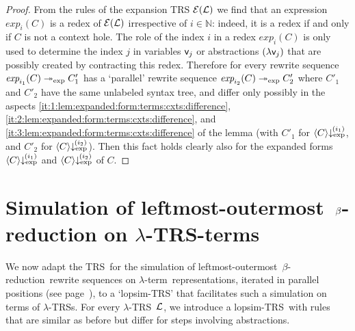 \documentclass[
submission
]{dmtcs-episciences-tampered}
\newcommand{\fap}[2]{#1({#2})}
\newcommand{\indap}[2]{#1 _{#2}}
\newcommand{\bpap}[3]{#1 _{#2}^{#3}}
\newcommand{\nb}{\nobreakdash}
\newcommand{\nf}{\normalfont}
\newcommand{\nat}{\mathbb{N}}
\newcommand{\alTRS}{{\cal L}}
\newcommand{\TRS}{TRS}
\newcommand{\sfolabs}[1]{(\lambda{#1})}
\newcommand{\afovar}{\mathsf{v}}
\newcommand{\afovari}[1]{\indap{\afovar}{\hspace*{-0.25pt}#1}}
\newcommand{\acxt}{C}
\newcommand{\sexpandTRS}{{\cal E}}
\newcommand{\expandTRSwrt}{\fap{\sexpandTRS}}
\newcommand{\lopsimTRS}{lopsim-TRS}
\newcommand{\smred}{\twoheadrightarrow}
\newcommand{\smredi}{\indap{\smred}}
\newcommand{\mredi}[1]{\mathrel{\smredi{#1}}}
\newcommand{\scriptexp}{\text{\nf exp}}
\newcommand{\sexpand}{\textit{exp}}
\newcommand{\sexpandi}{\indap{\sexpand}}
\newcommand{\expandi}[1]{\fap{\sexpandi{#1}}}
\newcommand{\expmred}{\mredi{\scriptexp}}
\newcommand{\sexprednfi}[1]{{\bpap{\downarrow}{\scriptexp}{\hspace*{-1pt}(#1)}}}
\newcommand{\exprednfi}[2]{{\langle#2\rangle}\sexprednfi{#1}}
\newcommand{\lambdaterm}{$\lambda$\nb-term}
\newcommand{\betareduction}{$\beta$\nb-re\-duc\-tion}
\newcommand{\lo}{left\-most-outer\-most}
\newcommand{\lTRS}{$\lambda$\hspace*{-0.5pt}\nb-\hspace*{-0.5pt}\TRS}
\theoremstyle{plain}
\theoremstyle{definition}
\begin{document}
\begin{proof}
  From the rules of the expansion TRS $\expandTRSwrt{\alTRS}$
  we find that
  an expression $\expandi{i}{\acxt}$ is a redex of $\expandTRSwrt{\alTRS}$ irrespective of $i\in\nat$:
  indeed, it is a redex if and only if $\acxt$ is not a context hole. 
  The role of the index $i$ in a redex $\expandi{i}{\acxt}$ is only used to determine
  the index $j$ in variables $\afovari{j}$ or abstractions $\sfolabs{\afovari{j}}$ 
  that are possibly created by contracting this redex.  
Therefore for every rewrite sequence $\expandi{i_1}{\acxt} \expmred \acxt'_1$ 
  has a `parallel' rewrite sequence $\expandi{i_2}{\acxt} \expmred \acxt'_2$
  where $\acxt'_1$ and $\acxt'_2$ have the same unlabeled syntax tree, and differ only possibly 
  in the aspects \eqref{it:1:lem:expanded:form:terms:cxts:difference}, \eqref{it:2:lem:expanded:form:terms:cxts:difference}, and \eqref{it:3:lem:expanded:form:terms:cxts:difference}
  of the lemma
  (with $\acxt'_1$ for $\exprednfi{i_1}{\acxt}$, and $\acxt'_2$ for $\exprednfi{i_2}{\acxt}$).
Then this fact holds clearly also for the expanded forms $\exprednfi{i_1}{\acxt}$ and $\exprednfi{i_2}{\acxt}$ of $\acxt$.
\end{proof}















\section{Simulation of \protect\lo\ $\protect\beta$-reduction on \protect\lTRS-terms}
  \label{sec:lo-simulation:lTRSs}


We now adapt the \TRS\ for the simulation of \lo\ \betareduction\ rewrite sequences on \lambdaterm\ representations,
iterated in parallel positions (see page~\pageref{def:losim:TRS:ltermreps}), 
to a `\lopsimTRS' that facilitates such a simulation on terms of \lTRS{s}. 
For every \lTRS~$\alTRS$, we introduce a \lopsimTRS\ with 
rules that are similar as before but differ for steps involving abstractions.
\end{document}
